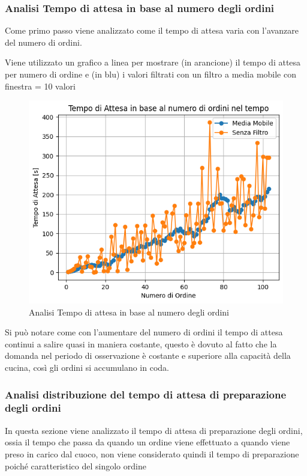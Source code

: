 \subsubsection{Analisi Tempo di attesa in base al numero degli ordini}
Come primo passo viene analizzato come il tempo di attesa varia con l'avanzare del numero di ordini.

Viene utilizzato un grafico a linea per mostrare (in arancione) il tempo di attesa per numero di ordine e (in blu) i valori filtrati con un filtro a media mobile con finestra = 10 valori

\begin{figure}[H]
	\centering
	\includegraphics[scale=0.6]{iterazione3/images/t_attesa_numero_ordini.png}
	\caption{Analisi Tempo di attesa in base al numero degli ordini\label{fig:lineplot}}
\end{figure}

Si può notare come con l'aumentare del numero di ordini il tempo di attesa continui a salire quasi in maniera costante, questo è dovuto al fatto che la domanda nel periodo di osservazione è costante e superiore alla capacità della cucina, così gli ordini si accumulano in coda.

\subsubsection{Analisi distribuzione del tempo di attesa di preparazione degli ordini}
In questa sezione viene analizzato il tempo di attesa di preparazione degli ordini, ossia il tempo che passa da quando un ordine viene effettuato a quando viene preso in carico dal cuoco, non viene considerato quindi il tempo di preparazione poiché caratteristico del singolo ordine

